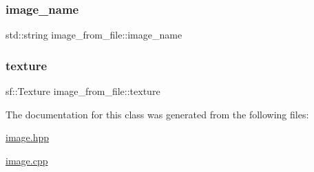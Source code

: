 \subsubsection{\texorpdfstring{image\+\_\+name}{image\_name}}
{\footnotesize\ttfamily std\+::string image\+\_\+from\+\_\+file\+::image\+\_\+name\hspace{0.3cm}{\ttfamily [private]}}

\mbox{\label{classimage__from__file_acb9ae2f3e9e14f8626738700efcb9826}} 
\subsubsection{\texorpdfstring{texture}{texture}}
{\footnotesize\ttfamily sf\+::\+Texture image\+\_\+from\+\_\+file\+::texture\hspace{0.3cm}{\ttfamily [private]}}



The documentation for this class was generated from the following files\+:\begin{DoxyCompactItemize}
\item 
\hyperlink{image_8hpp}{image.\+hpp}\item 
\hyperlink{image_8cpp}{image.\+cpp}\end{DoxyCompactItemize}
